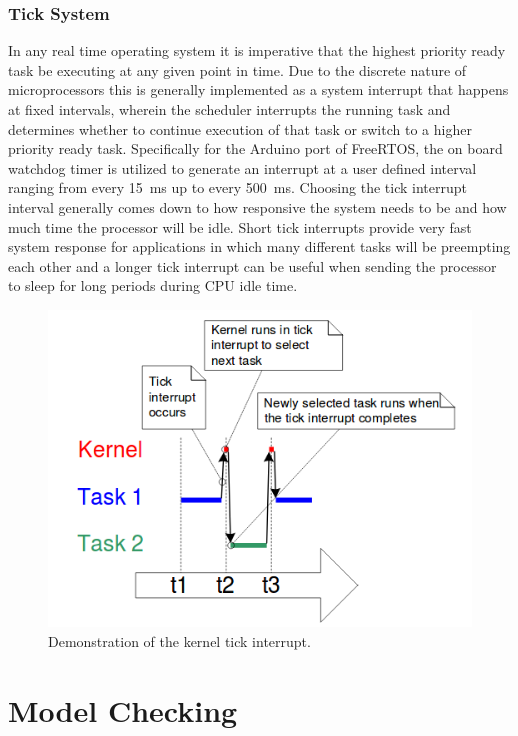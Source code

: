 \documentclass{article}
\begin{document}
\subsubsection{Tick System}
In any real time operating system it is imperative that the highest priority ready task be executing at any given point in time. Due to the discrete nature of microprocessors this is generally implemented as a system interrupt that happens at fixed intervals, wherein the scheduler interrupts the running task and determines whether to continue execution of that task or switch to a higher priority ready task. Specifically for the Arduino port of FreeRTOS, the on board watchdog timer is utilized to generate an interrupt at a user defined interval ranging from every \SI{15}{\milli\second} up to every \SI{500}{\milli\second}. Choosing the tick interrupt interval generally comes down to how responsive the system needs to be and how much time the processor will be idle. Short tick interrupts provide very fast system response for applications in which many different tasks will be preempting each other and a longer tick interrupt can be useful when sending the processor to sleep for long periods during CPU idle time. 
\begin{figure}[H]
\centering
        \includegraphics[scale=.5]{tick_interrupt.png}
    \caption{Demonstration of the kernel tick interrupt.}
    \label{fig:tick}
\end{figure}

\section{Model Checking}
\end{document}
